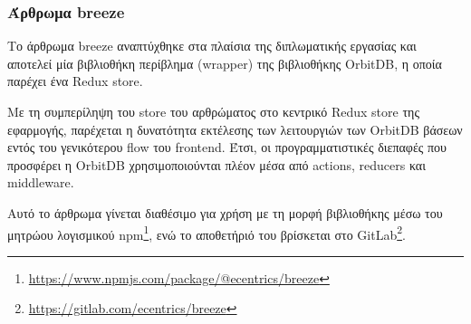 \subsubsection{Άρθρωμα breeze} \label{subsubsection:4-3-1-5-breeze-module}

Το άρθρωμα breeze αναπτύχθηκε στα πλαίσια της διπλωματικής εργασίας και αποτελεί μία βιβλιοθήκη περίβλημα (wrapper) της βιβλιοθήκης OrbitDB, η οποία παρέχει ένα Redux store. 

Με τη συμπερίληψη του store του αρθρώματος στο κεντρικό Redux store της εφαρμογής, παρέχεται η δυνατότητα εκτέλεσης των λειτουργιών των OrbitDB βάσεων εντός του γενικότερου flow του frontend. Έτσι, οι προγραμματιστικές διεπαφές που προσφέρει η OrbitDB χρησιμοποιούνται πλέον μέσα από actions, reducers και middleware.

Αυτό το άρθρωμα γίνεται διαθέσιμο για χρήση με τη μορφή βιβλιοθήκης μέσω του μητρώου λογισμικού npm\footnote{\url{https://www.npmjs.com/package/@ecentrics/breeze}}, ενώ το αποθετήριό του βρίσκεται στο GitLab\footnote{\url{https://gitlab.com/ecentrics/breeze}}.
